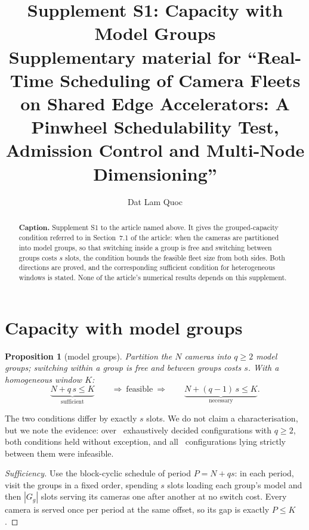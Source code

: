 \documentclass[final,5p,times,twocolumn]{elsarticle}
\newtheorem{proposition}{Proposition}
\newcommand{\Nc}{N}
\begin{document}
\begin{frontmatter}

\title{Supplement S1: Capacity with Model Groups\\
Supplementary material for ``Real-Time Scheduling of Camera Fleets on Shared Edge Accelerators:
A Pinwheel Schedulability Test, Admission Control and Multi-Node Dimensioning''}

\author[fsb]{Dat Lam Quoc}
\address[fsb]{FPT School of Business and Technology, FPT University,
Ho Chi Minh City, Viet Nam}

\begin{abstract}
\textbf{Caption.} Supplement S1 to the article named above. It gives the grouped-capacity
condition referred to in Section~7.1 of the article: when the cameras are partitioned into model
groups, so that switching inside a group is free and switching between groups costs $s$ slots,
the condition bounds the feasible fleet size from both sides. Both directions are proved, and the
corresponding sufficient condition for heterogeneous windows is stated. None of the article's
numerical results depends on this supplement.
\end{abstract}

\end{frontmatter}

\section{Capacity with model groups}

\begin{proposition}[model groups]\label{prop:groups}
Partition the $\Nc$ cameras into $q\ge2$ \emph{model groups}; switching within a group is free and
between groups costs $s$. With a homogeneous window $K$:
\[
\underbrace{\Nc+q\,s\le K}_{\text{sufficient}}
\qquad\Longrightarrow\ \text{feasible}\ \Longrightarrow\qquad
\underbrace{\Nc+(q-1)\,s\le K}_{\text{necessary}} .
\]
\end{proposition}

The two conditions differ by exactly $s$ slots. We do not claim a characterisation, but we note
the evidence: over \numCthreeQtwo\ exhaustively decided configurations with $q\ge2$, both
conditions held without exception, and all \numCthreeBand\ configurations lying strictly between
them were infeasible.

\begin{proof}[Sufficiency]
Use the block-cyclic schedule of period $P=\Nc+qs$: in each period, visit the groups in a fixed
order, spending $s$ slots loading each group's model and then $|G_g|$ slots serving its cameras
one after another at no switch cost. Every camera is served once per period at the same offset, so
its gap is exactly $P\le K$.
\end{proof}
\end{document}
